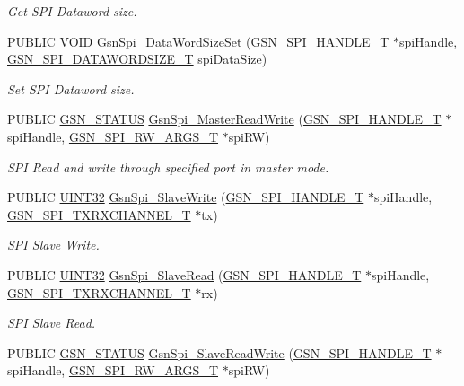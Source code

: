 \begin{DoxyCompactItemize}
\begin{DoxyCompactList}\small\item\em Get SPI Dataword size. \end{DoxyCompactList}\item 
PUBLIC VOID \hyperlink{a00655_ga71fc3b8ddb2373618758cec70b2ccdca}{GsnSpi\_\-DataWordSizeSet} (\hyperlink{a00238}{GSN\_\-SPI\_\-HANDLE\_\-T} $\ast$spiHandle, \hyperlink{a00655_ga63cbe81427185213bde26b93dde72747}{GSN\_\-SPI\_\-DATAWORDSIZE\_\-T} spiDataSize)
\begin{DoxyCompactList}\small\item\em Set SPI Dataword size. \end{DoxyCompactList}\item 
PUBLIC \hyperlink{a00660_gada5951904ac6110b1fa95e51a9ddc217}{GSN\_\-STATUS} \hyperlink{a00655_ga29d51974bb0e80ae4191a339731c3319}{GsnSpi\_\-MasterReadWrite} (\hyperlink{a00238}{GSN\_\-SPI\_\-HANDLE\_\-T} $\ast$spiHandle, \hyperlink{a00239}{GSN\_\-SPI\_\-RW\_\-ARGS\_\-T} $\ast$spiRW)
\begin{DoxyCompactList}\small\item\em SPI Read and write through specified port in master mode. \end{DoxyCompactList}\item 
PUBLIC \hyperlink{a00660_gae1e6edbbc26d6fbc71a90190d0266018}{UINT32} \hyperlink{a00655_ga687e89dafd17ddd4cc90c4b744e3696d}{GsnSpi\_\-SlaveWrite} (\hyperlink{a00238}{GSN\_\-SPI\_\-HANDLE\_\-T} $\ast$spiHandle, \hyperlink{a00241}{GSN\_\-SPI\_\-TXRXCHANNEL\_\-T} $\ast$tx)
\begin{DoxyCompactList}\small\item\em SPI Slave Write. \end{DoxyCompactList}\item 
PUBLIC \hyperlink{a00660_gae1e6edbbc26d6fbc71a90190d0266018}{UINT32} \hyperlink{a00655_gacdf999cddafe165dbbc991808f6db208}{GsnSpi\_\-SlaveRead} (\hyperlink{a00238}{GSN\_\-SPI\_\-HANDLE\_\-T} $\ast$spiHandle, \hyperlink{a00241}{GSN\_\-SPI\_\-TXRXCHANNEL\_\-T} $\ast$rx)
\begin{DoxyCompactList}\small\item\em SPI Slave Read. \end{DoxyCompactList}\item 
PUBLIC \hyperlink{a00660_gada5951904ac6110b1fa95e51a9ddc217}{GSN\_\-STATUS} \hyperlink{a00655_ga5733034f9b6e7a4307c9a42ae94ff331}{GsnSpi\_\-SlaveReadWrite} (\hyperlink{a00238}{GSN\_\-SPI\_\-HANDLE\_\-T} $\ast$spiHandle, \hyperlink{a00239}{GSN\_\-SPI\_\-RW\_\-ARGS\_\-T} $\ast$spiRW)

\end{DoxyCompactItemize}
